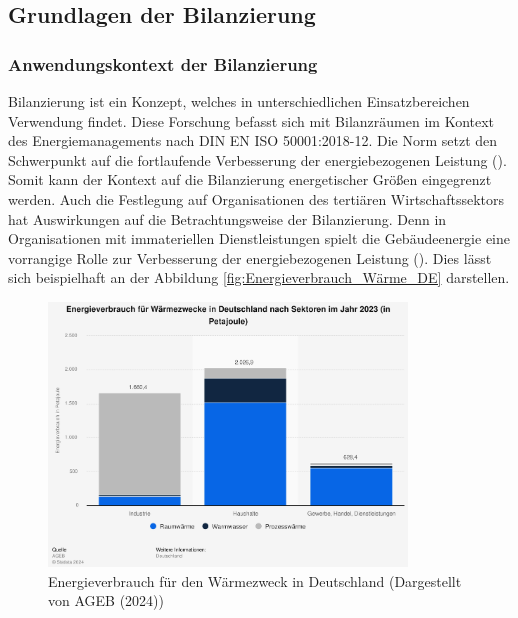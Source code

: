 \subsection{Grundlagen der Bilanzierung}

\subsubsection{Anwendungskontext der Bilanzierung}

Bilanzierung ist ein Konzept, welches in unterschiedlichen Einsatzbereichen Verwendung findet. Diese Forschung befasst sich mit Bilanzräumen im Kontext des 
Energiemanagements nach DIN EN ISO 50001:2018-12. Die Norm setzt den Schwerpunkt auf die fortlaufende Verbesserung der energiebezogenen Leistung 
(\cite[Kapitel 0.2]{DIN50001.2018}). Somit kann der Kontext auf die Bilanzierung energetischer Größen eingegrenzt werden.
Auch die Festlegung auf Organisationen des tertiären Wirtschaftssektors hat Auswirkungen auf die Betrachtungsweise der Bilanzierung. Denn in Organisationen 
mit immateriellen Dienstleistungen spielt die Gebäudeenergie eine vorrangige Rolle zur Verbesserung der energiebezogenen Leistung (\cite[S. 3]{Fichera.2020}).
Dies lässt sich beispielhaft an der Abbildung \eqref{fig:Energieverbrauch_Wärme_DE} darstellen.

\begin{figure}[H]
    \centering
    \includegraphics[width=0.85\textwidth]{../../Ressourcen/Abbildungen/Energieverbrauch_für_Wärmezweck_DE.jpg}
    \caption{Energieverbrauch für den Wärmezweck in Deutschland (Dargestellt von AGEB (2024))}
    \label{fig:Energieverbrauch_Wärme_DE}
\end{figure}

